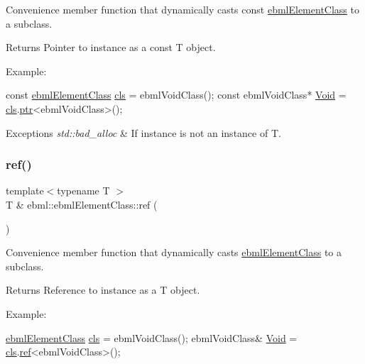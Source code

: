 Convenience member function that dynamically casts const \mbox{\hyperlink{classebml_1_1ebmlElementClass}{ebml\+Element\+Class}} to a subclass.

\begin{DoxyReturn}{Returns}
Pointer to instance as a const T object.
\end{DoxyReturn}
Example\+: 
\begin{DoxyCode}
\textcolor{keyword}{const} \mbox{\hyperlink{classebml_1_1ebmlElementClass_a6c2081870c5d66c70e0cf988ff253420}{ebmlElementClass}} \mbox{\hyperlink{classebml_1_1ebmlElement_a15cf59e94b01e2c49ec96512b9bd9d90}{cls}} = ebmlVoidClass();
\textcolor{keyword}{const} ebmlVoidClass* \mbox{\hyperlink{namespaceebml_afbfd509d1cb71e416a07253746e886e9}{Void}} = \mbox{\hyperlink{classebml_1_1ebmlElement_a15cf59e94b01e2c49ec96512b9bd9d90}{cls}}.\mbox{\hyperlink{classebml_1_1ebmlElementClass_af6901ccaf31aa832687777a0c225abd2}{ptr}}<ebmlVoidClass>();
\end{DoxyCode}
 
\begin{DoxyExceptions}{Exceptions}
{\em std\+::bad\+\_\+alloc} & If instance is not an instance of T. \\
\hline
\end{DoxyExceptions}
\mbox{\label{classebml_1_1ebmlElementClass_a9ad70f610118f70424b5ff92468ad1ca}} 
\subsubsection{\texorpdfstring{ref()}{ref()}\hspace{0.1cm}{\footnotesize\ttfamily [1/2]}}
{\footnotesize\ttfamily template$<$typename T $>$ \\
T \& ebml\+::ebml\+Element\+Class\+::ref (\begin{DoxyParamCaption}{ }\end{DoxyParamCaption})}

Convenience member function that dynamically casts \mbox{\hyperlink{classebml_1_1ebmlElementClass}{ebml\+Element\+Class}} to a subclass.

\begin{DoxyReturn}{Returns}
Reference to instance as a T object.
\end{DoxyReturn}
Example\+: 
\begin{DoxyCode}
\mbox{\hyperlink{classebml_1_1ebmlElementClass_a6c2081870c5d66c70e0cf988ff253420}{ebmlElementClass}} \mbox{\hyperlink{classebml_1_1ebmlElement_a15cf59e94b01e2c49ec96512b9bd9d90}{cls}} = ebmlVoidClass();
ebmlVoidClass& \mbox{\hyperlink{namespaceebml_afbfd509d1cb71e416a07253746e886e9}{Void}} = \mbox{\hyperlink{classebml_1_1ebmlElement_a15cf59e94b01e2c49ec96512b9bd9d90}{cls}}.\mbox{\hyperlink{classebml_1_1ebmlElementClass_a9ad70f610118f70424b5ff92468ad1ca}{ref}}<ebmlVoidClass>();
\end{DoxyCode}
 
